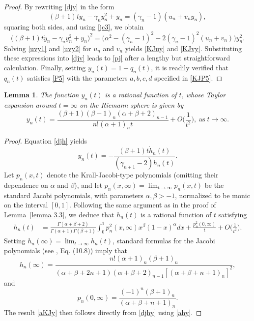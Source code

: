\documentclass[10pt, reqno]{amsart}
\numberwithin{equation}{section}
\newtheorem{lemma}{Lemma}[section]
\numberwithin{equation}{section}
\begin{document}
\begin{proof}
By rewriting \eqref{djy} in the form 
\begin{equation}
(\beta+1)t\dot{y}_n-\gamma_ny_n^2+y_n=(\gamma_n-1)(u_n+v_ny_n),\label{uvy1}
\end{equation}
squaring both sides, and using \eqref{jc3}, we obtain
\begin{equation}
\big((\beta+1)t\dot{y}_n-\gamma_ny_n^2+y_n\big)^2=\big(\alpha^2-(\gamma_n-1)^2-2(\gamma_n-1)^2(u_n+v_n)\big)y_n^2.\label{uvy2}
\end{equation}
Solving \eqref{uvy1} and \eqref{uvy2} for $u_n$ and $v_n$ yields \eqref{KJuy} and \eqref{KJvy}. Substituting these expressions into \eqref{djv} leads to \eqref{pj} after a lengthy but straightforward calculation. Finally, setting  $y_n(t)=1-q_n(t)$, it is readily verified that $q_n(t)$ satisfies \eqref{P5} with the parameters $a,b,c,d$ specified in \eqref{KJP5}.
\end{proof}
\begin{lemma} \label{lemma 4.3}
The function $y_n(t)$ is a rational function of $t$, whose Taylor expansion around $t=\infty$ on the Riemann sphere is given by
\begin{equation} \label{aKJy}
y_n(t)=\frac{(\beta+1)(\beta+1)_n(\alpha+\beta+2)_{n-1}}{n!(\alpha+1)_n t}+O\Big(\frac{1}{t^2}\Big),\;\mbox{as}\;t\to\infty.
\end{equation}
\end{lemma}
\begin{proof}
Equation \eqref{djh} yields
\begin{equation}
y_n(t)=-\frac{(\beta+1)t\dot{h}_n(t)}{(\gamma_{n+1}-2)h_n(t)}.\label{djhy}
\end{equation}
Let $p_n(x,t)$ denote the Krall-Jacobi-type polynomials (omitting their dependence on $\alpha$ and $\beta$), and let $p_n(x,\infty)=\lim_{t\to\infty} p_n(x,t)$ be the standard Jacobi polynomials, with parameters $\alpha,\beta >-1$, normalized to be monic on the interval $[0, 1]$. Following the same argument as in the proof of Lemma~\ref{lemma 3.3}, we deduce that $h_n(t)$ is a rational function of $t$ satisfying
\begin{align}
h_n(t)&=\frac{\Gamma(\alpha+\beta+2)}{\Gamma(\alpha+1)\Gamma(\beta+1)}\int_0^1 p_n^2(x,\infty) x^\beta(1-x)^{\alpha}dx+\frac{p_n^2(0,\infty)}{t}+O\Big(\frac{1}{t^2}\Big). \label{ahy}
\end{align}
Setting $h_n(\infty)=\lim_{t\to\infty} h_n(t)$, standard formulas for the Jacobi polynomials (see \cite{EMOT}, Eq. (10.8)) imply that 
\begin{equation*}
h_n(\infty)=\frac{n!(\alpha+1)_n(\beta+1)_n}{(\alpha+\beta+2n+1)(\alpha+\beta+2)_{n-1}[(\alpha+\beta+n+1)_n]^2},
\end{equation*}
and
\begin{equation*}
p_n(0,\infty)=\frac{(-1)^n(\beta+1)_n}{(\alpha+\beta+n+1)_n}.
\end{equation*}
The result \eqref{aKJy} then follows directly from \eqref{djhy} using \eqref{ahy}.
\end{proof}
\end{document}
